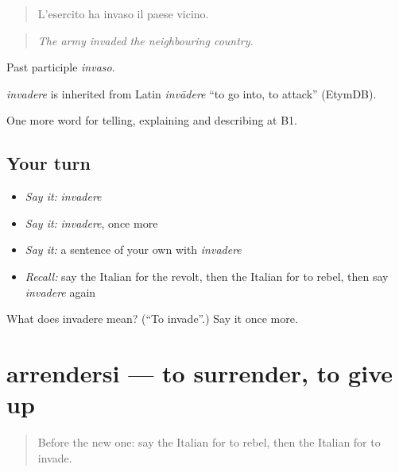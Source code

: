 \begin{quote}
L'esercito ha invaso il paese vicino.
\end{quote}

\begin{quote}
\emph{The army invaded the neighbouring country.}
\end{quote}

Past participle \emph{invaso}.

\begin{cousinweb}
\emph{invadere} is inherited from Latin \emph{invādere} \textquotedblleft{}to go into, to attack\textquotedblright{} (EtymDB).
\end{cousinweb}

\begin{grammarlens}[title={What you've built}]
One more word for telling, explaining and describing at B1.
\end{grammarlens}

\subsection*{Your turn}
\begin{itemize}
\raggedright
  \item \emph{Say it:} \emph{invadere}
  \item \emph{Say it:} \emph{invadere}, once more
  \item \emph{Say it:} a sentence of your own with \emph{invadere}
  \item \emph{Recall:} say the Italian for the revolt, then the Italian for to rebel, then say \emph{invadere} again
\end{itemize}

\begin{tcolorbox}[breakable,colback=teal!4,colframe=teal!35!black,title={Before you move on}]
What does invadere mean? (\textquotedblleft{}To invade\textquotedblright{}.) Say it once more.
\end{tcolorbox}
\section[arrendersi]{arrendersi — to surrender, to give up}

\label{lesson:IT-C329-arrendersi}



\begin{quote}
Before the new one: say the Italian for to rebel, then the Italian for to invade.
\end{quote}

